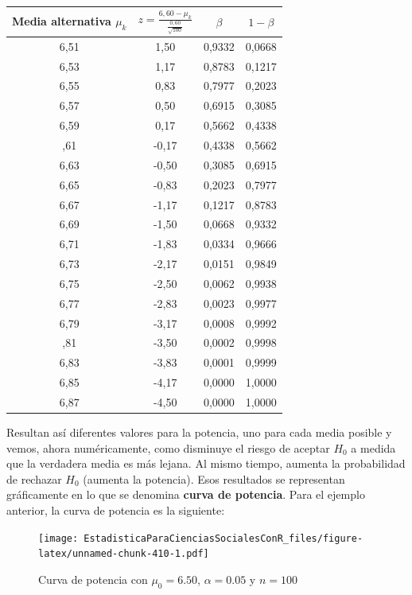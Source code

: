 \documentclass[]{book}
\begin{document}
\begin{table}[H]
\centering
\begin{tabular}{cccc}
\toprule
Media alternativa $\mu_{k}$ & $z = \frac{6,60 - \mu_{k}}{\frac{0,60}{\sqrt{100}}}$ & $\beta$ & $1 - \beta$\\
\midrule
\rowcolor{gray!6}  6,51 & 1,50 & 0,9332 & 0,0668\\
6,53 & 1,17 & 0,8783 & 0,1217\\
\rowcolor{gray!6}  6,55 & 0,83 & 0,7977 & 0,2023\\
6,57 & 0,50 & 0,6915 & 0,3085\\
\rowcolor{gray!6}  6,59 & 0,17 & 0,5662 & 0,4338\\
\addlinespace
6,61 & -0,17 & 0,4338 & 0,5662\\
\rowcolor{gray!6}  6,63 & -0,50 & 0,3085 & 0,6915\\
6,65 & -0,83 & 0,2023 & 0,7977\\
\rowcolor{gray!6}  6,67 & -1,17 & 0,1217 & 0,8783\\
6,69 & -1,50 & 0,0668 & 0,9332\\
\addlinespace
\rowcolor{gray!6}  6,71 & -1,83 & 0,0334 & 0,9666\\
6,73 & -2,17 & 0,0151 & 0,9849\\
\rowcolor{gray!6}  6,75 & -2,50 & 0,0062 & 0,9938\\
6,77 & -2,83 & 0,0023 & 0,9977\\
\rowcolor{gray!6}  6,79 & -3,17 & 0,0008 & 0,9992\\
\addlinespace
6,81 & -3,50 & 0,0002 & 0,9998\\
\rowcolor{gray!6}  6,83 & -3,83 & 0,0001 & 0,9999\\
6,85 & -4,17 & 0,0000 & 1,0000\\
\rowcolor{gray!6}  6,87 & -4,50 & 0,0000 & 1,0000\\
\bottomrule
\end{tabular}
\end{table}

Resultan así diferentes valores para la potencia, uno para cada media
posible y vemos, ahora numéricamente, como disminuye el riesgo de
aceptar \(H_0\) a medida que la verdadera media es más lejana. Al mismo
tiempo, aumenta la probabilidad de rechazar \(H_0\) (aumenta la potencia).
Esos resultados se representan gráficamente en lo que se denomina
\textbf{curva de potencia}. Para el ejemplo anterior, la curva de potencia es
la siguiente:

\begin{figure}
\centering
\texttt{[image: EstadisticaParaCienciasSocialesConR\_files/figure-latex/unnamed-chunk-410-1.pdf]}
\caption{\label{fig:unnamed-chunk-410}Curva de potencia con \(\mu_{0} = 6.50\), \(\alpha = 0.05\) y \(n = 100\)}
\end{figure}
\end{document}
